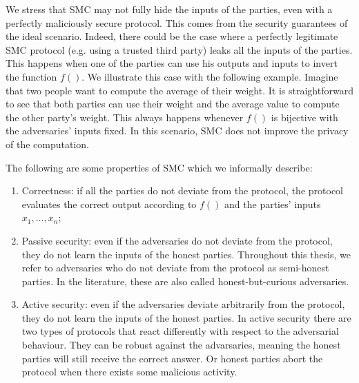 We stress that SMC may not fully hide the inputs of the parties, even with a perfectly maliciously secure protocol. This comes from the security guarantees of the ideal scenario. Indeed, there could be the case where a perfectly legitimate SMC protocol (e.g. using a trusted third party) leaks all the inputs of the parties. This happens when one of the parties can use his outputs and inputs to invert the function $f()$. We illustrate this case with the following example. Imagine that two people want to compute the average of their weight. It is straightforward to see that both parties can use their weight and the average value to compute the other party's weight. This always happens whenever $f()$ is bijective with the adversaries' inputs fixed. In this scenario, SMC does not improve the privacy of the computation. 
%

The following are some properties of SMC which we informally describe:

\begin{enumerate}
\item Correctness: if all the parties do not deviate from the protocol, the protocol evaluates the correct output according to $f()$ and the parties' inputs $x_1, \ldots, x_n$;

\item Passive security: even if the adversaries do not deviate from the protocol, they do not learn the inputs of the honest parties. Throughout this thesis, we refer to adversaries who do not deviate from the protocol as semi-honest parties. In the literature, these are also called honest-but-curious adversaries.

\item Active security: even if the adversaries deviate arbitrarily from the protocol, they do not learn the inputs of the honest parties. In active security there are two types of protocols that react differently with respect to the adversarial behaviour. They can be robust against the advarsaries, meaning the honest parties will still receive the correct answer. Or honest parties abort the protocol when there exists some malicious activity.
\end{enumerate}

